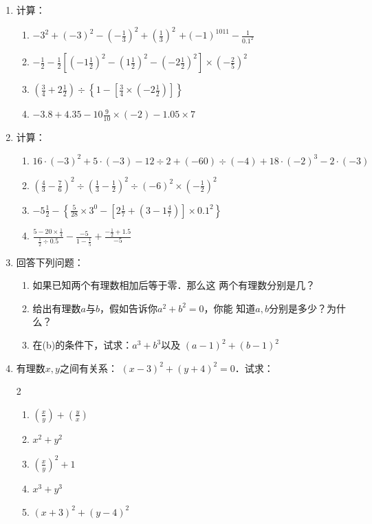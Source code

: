 \begin{enumerate}
\item  计算：
\begin{enumerate}
\item $-3^{2}+(-3)^{2}-\left(-\frac{1}{3}\right)^{2}+\left(\frac{1}{3}\right)^{2}$
$+(-1)^{1011}-\frac{1}{0.1^{2}}$
\item $-\frac{1}{2}-\frac{1}{2}\left[\left(-1 \frac{1}{2}\right)^{2}-\left(1 \frac{1}{2}\right)^{2}-\left(-2 \frac{1}{2}\right)^{2}\right] \times\left(-\frac{2}{5}\right)^{2}$
\item $\left(\frac{3}{4}+2 \frac{1}{2}\right) \div\left\{1-\left[\frac{3}{4} \times\left(-2 \frac{1}{2}\right)\right]\right\}$
\item $-3.8+4.35-10 \frac{9}{10} \times(-2)-1.05 \times 7$
\end{enumerate}


\item 计算：
\begin{enumerate}
    \item $16 \cdot(-3)^{2}+5 \cdot(-3)-12 \div 2+(-60) \div(-4)+18 \cdot(-2)^{3}-2 \cdot(-3)$
    \item $\left(\frac{4}{3}-\frac{7}{6}\right)^{2} \div\left(\frac{1}{3}-\frac{1}{2}\right)^{2} \div(-6)^{2} \times\left(-\frac{1}{2}\right)^{2}$
    \item $-5 \frac{1}{2}-\left\{\frac{5}{28} \times 3^{0}-\left[2 \frac{1}{7}+\left(3-1 \frac{4}{7}\right)\right] \times 0.1^{2}\right\}$
    \item $\frac{5-20 \times \frac{1}{4}}{\frac{1}{2}\div 0.5}-\frac{-5}{1-\frac{1}{5}}+\frac{-\frac{1}{2}+1.5}{-5}$
\end{enumerate}

\item  回答下列问题：
\begin{enumerate}
    \item 如果已知两个有理数相加后等于零．那么这
    两个有理数分别是几？
    \item 给出有理数$a$与$b$，假如告诉你$a^2 +b^2=0$，你能
    知道$a, b$分别是多少？为什么？
    \item 在(b)的条件下，试求：$a^3+b^3$以及
    $(a-1)^2+(b-1)^2$
\end{enumerate}


\item  有理数$x,  y$之间有关系：
$(x-3)^2+(y+4)^2=0$．试求：
\begin{multicols}{2}
    \begin{enumerate}
        \item $\left(\frac{x}{y}\right)+\left(\frac{y}{x}\right)$
        \item $x^2+y^2$
        \item $\left(\frac{x}{y}\right)^2+1$
        \item $x^3+y^3$
        \item $(x+3)^2+(y-4)^2$
    \end{enumerate}
\end{multicols}
\end{enumerate}


